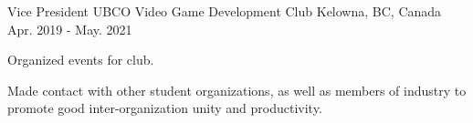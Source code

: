

\begin{cventries}

  \cventry
    {Vice President} %
    {UBCO Video Game Development Club} %
    {Kelowna, BC, Canada} %
    {Apr. 2019 - May. 2021} %
    {
      \begin{cvitems} %
        \item {Organized events for club.}
        \item {Made contact with other student organizations, as well as members of industry to promote good inter-organization unity and productivity.}
      \end{cvitems}
    }

\end{cventries}
